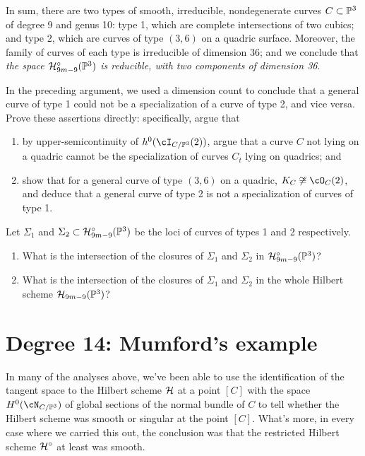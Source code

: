 In sum, there are two types of smooth, irreducible, nondegenerate curves $C \subset \PP^3$ of degree 9 and genus 10: type 1, which are complete intersections of two cubics; and type 2, which are curves of type $(3,6)$ on a quadric surface. Moreover, the family of curves of each type is irreducible of dimension 36; and we conclude that \emph{the space $\cH^\circ_{9m-9}(\PP^3)$ is reducible, with two components of dimension 36}.


\begin{exercise}
In the preceding argument, we used a dimension count to conclude that a general curve of type 1 could not be a specialization of a curve of type 2, and vice versa. Prove these assertions directly: specifically, argue that
\begin{enumerate}
\item by upper-semicontinuity of $h^0(\cI_{C/\PP^3}(2))$, argue that a curve $C$ not lying on a quadric cannot be the specialization of curves $C_t$ lying on quadrics; and
\item show that for a general curve of type $(3,6)$ on a quadric, $K_C \not\cong \cO_C(2)$, and deduce that a general curve of type 2 is not a specialization of curves of type 1.
\end{enumerate}
\end{exercise}

\begin{exercise}
Let $\Sigma_1$ and $\Sigma_2 \subset \cH^\circ_{9m-9}(\PP^3)$ be the loci of curves of types 1 and 2 respectively. 
\begin{enumerate}
\item What is the intersection of the closures of $\Sigma_1$ and $\Sigma_2$ in $\cH^\circ_{9m-9}(\PP^3)$?
\item What is the intersection of the closures of $\Sigma_1$ and $\Sigma_2$ in the whole Hilbert scheme $\cH_{9m-9}(\PP^3)$?
\end{enumerate}
\end{exercise}

 

\section{Degree 14: Mumford's example}\label{mumford example}

In many of the analyses above, we've been able to use the identification of the tangent space to the Hilbert scheme $\cH$ at a point $[C]$ with the space $H^0(\cN_{C/\PP^3})$ of global sections of the normal bundle of $C$ to tell whether the Hilbert scheme was smooth or singular at the point $[C]$. What's more, in every case where we carried this out, the conclusion was that the restricted Hilbert scheme $\cH^\circ$ at least was smooth.

